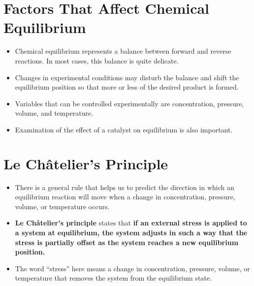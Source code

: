 \documentclass[a4paper,12pt,twocolumn]{article}
\begin{document}
\section{Factors That Affect Chemical Equilibrium}
\begin{itemize}
    \item Chemical equilibrium represents a balance between forward and reverse reactions. In most cases, this balance is quite delicate. 
    \item Changes in experimental conditions may disturb the balance and shift the equilibrium position so that more or less of the desired product is formed. 
    \item Variables that can be controlled experimentally are concentration, pressure, volume, and temperature.
    \item Examination of the effect of a catalyst on equilibrium is also important.
          
\end{itemize}

\section{Le Châtelier’s Principle}
\begin{itemize}
    \item There is a general rule that helps us to predict the direction in which an equilibrium reaction will move when a change in concentration, pressure, volume, or temperature occurs. 
    \item \textbf{Le Châtelier’s principle} states that \textbf{if an external stress is applied to a system at equilibrium, the system adjusts in such a way that the stress is partially offset as the system reaches a new equilibrium position.}
    \item The word “stress” here means a change in concentration, pressure, volume, or temperature that removes the system from the equilibrium state. 
          
\end{itemize}
\end{document}
